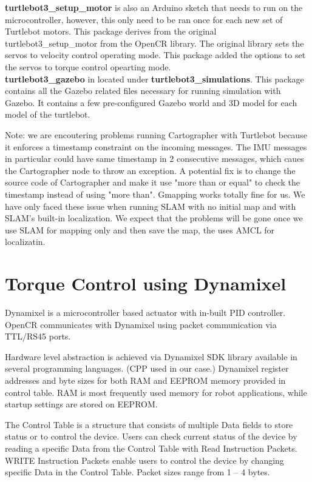 \documentclass[12]{article}
\begin{document}
\textbf{turtlebot3\_setup\_motor} is also an Arduino sketch that needs to run on the microcontroller, however, 
this only need to be ran once for each new set of Turtlebot motors. 
This package derives from the original turtlebot3\_setup\_motor from the OpenCR library. The original library sets the servos to velocity control operating mode. 
This package added the options to set the servos to torque control opearting mode. \\

\textbf{turtlebot3\_gazebo} in located under \textbf{turtlebot3\_simulations}. This package contains all the Gazebo related files necessary for running simulation with Gazebo. 
It contains a few pre-configured Gazebo world and 3D model for each model of the turtlebot. 

Note: we are encoutering problems running Cartographer with Turtlebot because it enforces a timestamp constraint on the incoming messages. 
The IMU messages in particular could have same timestamp in 2 consecutive messages, which caues the Cartographer node to throw an exception. 
A potential fix is to change the source code of Cartographer and make it use "more than or equal" to check the timestamp instead of using "more than".
Gmapping works totally fine for us. We have only faced these issue when running SLAM with no initial map and with SLAM's built-in localization. 
We expect that the problems will be gone once we use SLAM for mapping only and then save the map, the uses AMCL for localizatin. 

\section{Torque Control using Dynamixel}
       
Dynamixel is a microcontroller based actuator with in-built PID controller. OpenCR communicates with Dynamixel using packet communication via TTL/RS45 ports. 

Hardware level abstraction is achieved via Dynamixel SDK library available in several programming languages. (CPP used in our case.)
Dynamixel register addresses and byte sizes for both RAM and EEPROM memory provided in control table. RAM is most frequently used memory for robot applications, while startup settings are stored on EEPROM.

The Control Table is a structure that consists of multiple Data fields to store status or to control the device. Users can check current status of the device by reading a specific Data from the Control Table with Read Instruction Packets. WRITE Instruction Packets enable users to control the device by changing specific Data in the Control Table. Packet sizes range from 1 – 4 bytes.
\end{document}
